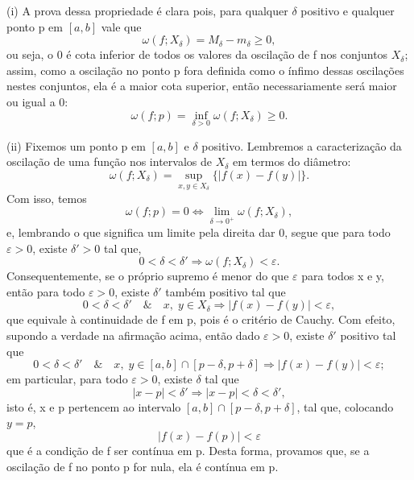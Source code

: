 \documentclass[../analysisII_notes.tex]{subfiles}
\begin{document}
\begin{proof*}
	(i) A prova dessa propriedade é clara pois, para qualquer \(\delta \) positivo e qualquer ponto p em \([a, b]\) vale que
	\[
		\omega (f; X_{\delta }) = M_{\delta } -m_{\delta } \geq 0,
	\]
	ou seja, o 0 é cota inferior de todos os valores da oscilação de f nos conjuntos \(X_{\delta }\); assim, como a oscilação no ponto p fora definida como o ínfimo dessas oscilações nestes conjuntos, ela é a maior cota superior, então necessariamente será maior ou igual a 0:
	\[
		\omega(f; p) = \inf_{\delta > 0}\omega (f; X_{\delta })\geq 0.
	\]

	(ii) Fixemos um ponto p em \([a, b]\) e \(\delta \) positivo. Lembremos a caracterização da oscilação de uma função nos intervalos de \(X_{\delta }\) em termos do diâmetro:
	\[
		\omega (f; X_{\delta }) = \sup\limits_{x, y\in X_{\delta }}\{|f(x)-f(y)|\}.
	\]
	Com isso, temos
	\[
		\omega (f; p) = 0 \Longleftrightarrow \lim_{\delta \to 0^{+}}\omega (f; X_{\delta }),
	\]
	e, lembrando o que significa um limite pela direita dar 0, segue que para todo \(\varepsilon  > 0\), existe \(\delta '>0\) tal que,
	\[
		0 < \delta < \delta ' \Rightarrow \omega (f; X_{\delta }) < \varepsilon .
	\]
	Consequentemente, se o próprio supremo é menor do que \(\varepsilon \) para todos x e y, então para todo \(\varepsilon > 0\), existe \(\delta '\) também positivo tal que
	\[
		0 < \delta < \delta ' \quad\&\quad x,\; y\in X_{\delta } \Rightarrow |f(x)-f(y)|<\varepsilon,
	\]
	que equivale à continuidade de f em p, pois é o critério de Cauchy. Com efeito, supondo a verdade na afirmação acima, então dado \(\varepsilon > 0\), existe \(\delta '\) positivo tal que
	\[
		0 < \delta < \delta ' \quad\&\quad x,\; y\in [a, b]\cap [p-\delta , p+\delta ] \Rightarrow |f(x)-f(y)|<\varepsilon;
	\]
	em particular, para todo \(\varepsilon > 0\), existe \(\delta \) tal que
	\[
		|x-p|<\delta ' \Rightarrow |x-p| < \delta <\delta ',
	\]
	isto é, x e p pertencem ao intervalo \([a, b]\cap [p-\delta , p+\delta ]\), tal que, colocando \(y=p\),
	\[
		|f(x)-f(p)| < \varepsilon
	\]
	que é a condição de f ser contínua em p. Desta forma, provamos que, se a oscilação de f no ponto p for nula, ela é contínua em p.


\end{proof*}
\end{document}
